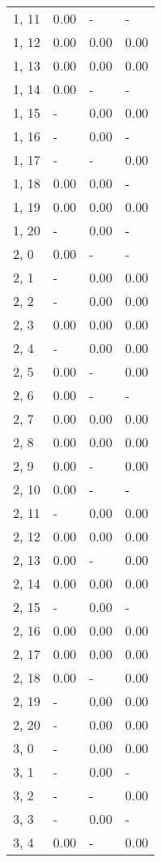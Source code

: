 \begin{table}
\begin{tabular}{llll}
1, 11  &  0.00 &     - &     - \\
1, 12  &  0.00 &  0.00 &  0.00 \\
1, 13  &  0.00 &  0.00 &  0.00 \\
1, 14  &  0.00 &     - &     - \\
1, 15  &     - &  0.00 &  0.00 \\
1, 16  &     - &  0.00 &     - \\
1, 17  &     - &     - &  0.00 \\
1, 18  &  0.00 &  0.00 &     - \\
1, 19  &  0.00 &  0.00 &  0.00 \\
1, 20  &     - &  0.00 &     - \\
2, 0   &  0.00 &     - &     - \\
2, 1   &     - &  0.00 &  0.00 \\
2, 2   &     - &  0.00 &  0.00 \\
2, 3   &  0.00 &  0.00 &  0.00 \\
2, 4   &     - &  0.00 &  0.00 \\
2, 5   &  0.00 &     - &  0.00 \\
2, 6   &  0.00 &     - &     - \\
2, 7   &  0.00 &  0.00 &  0.00 \\
2, 8   &  0.00 &  0.00 &  0.00 \\
2, 9   &  0.00 &     - &  0.00 \\
2, 10  &  0.00 &     - &     - \\
2, 11  &     - &  0.00 &  0.00 \\
2, 12  &  0.00 &  0.00 &  0.00 \\
2, 13  &  0.00 &     - &  0.00 \\
2, 14  &  0.00 &  0.00 &  0.00 \\
2, 15  &     - &  0.00 &     - \\
2, 16  &  0.00 &  0.00 &  0.00 \\
2, 17  &  0.00 &  0.00 &  0.00 \\
2, 18  &  0.00 &     - &  0.00 \\
2, 19  &     - &  0.00 &  0.00 \\
2, 20  &     - &  0.00 &  0.00 \\
3, 0   &     - &  0.00 &  0.00 \\
3, 1   &     - &  0.00 &     - \\
3, 2   &     - &     - &  0.00 \\
3, 3   &     - &  0.00 &     - \\
3, 4   &  0.00 &     - &  0.00 \\

\end{tabular}
\end{table}
